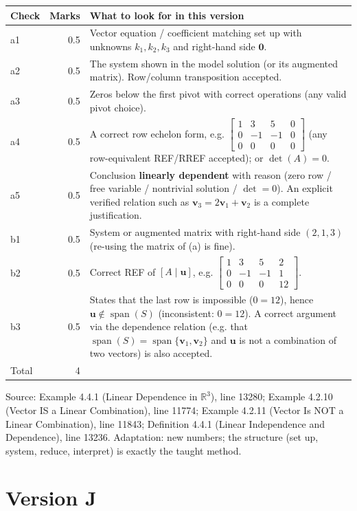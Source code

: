 \documentclass[11pt,a4paper]{article}
\newcommand{\Src}[1]{{\footnotesize\color{black!65}Source: #1}}
\begin{document}
\begin{tabularx}{\linewidth}{@{}l r X@{}}\toprule Check & Marks & What to look for in this version\\\midrule
a1 & 0.5 & Vector equation / coefficient matching set up with unknowns $k_1,k_2,k_3$ and right-hand side $\mathbf{0}$.\\
a2 & 0.5 & The system shown in the model solution (or its augmented matrix). Row/column transposition accepted.\\
a3 & 0.5 & Zeros below the first pivot with correct operations (any valid pivot choice).\\
a4 & 0.5 & A correct row echelon form, e.g. $\left[\begin{array}{ccc|c} 1 & 3 & 5 & 0 \\ 0 & -1 & -1 & 0 \\ 0 & 0 & 0 & 0 \end{array}\right]$ (any row-equivalent REF/RREF accepted); or $\det(A)=0$.\\
a5 & 0.5 & Conclusion \textbf{linearly dependent} with reason (zero row / free variable / nontrivial solution / $\det=0$). An explicit verified relation such as $\mathbf{v}_3=2\mathbf{v}_1+\mathbf{v}_2$ is a complete justification.\\
b1 & 0.5 & System or augmented matrix with right-hand side $(2,1,3)$ (re-using the matrix of (a) is fine).\\
b2 & 0.5 & Correct REF of $[A\mid\mathbf{u}]$, e.g. $\left[\begin{array}{ccc|c} 1 & 3 & 5 & 2 \\ 0 & -1 & -1 & 1 \\ 0 & 0 & 0 & 12 \end{array}\right]$.\\
b3 & 0.5 & States that the last row is impossible ($0=12$), hence $\mathbf{u}\notin\operatorname{span}(S)$ (inconsistent: $0=12$). A correct argument via the dependence relation (e.g. that $\operatorname{span}(S)=\operatorname{span}\{\mathbf{v}_1,\mathbf{v}_2\}$ and $\mathbf{u}$ is not a combination of two vectors) is also accepted.\\
\midrule Total & 4 & \\\bottomrule\end{tabularx}
\Src{Example 4.4.1 (Linear Dependence in $\mathbb{R}^3$), line 13280; Example 4.2.10 (Vector IS a Linear Combination), line 11774; Example 4.2.11 (Vector Is NOT a Linear Combination), line 11843; Definition 4.4.1 (Linear Independence and Dependence), line 13236. Adaptation: new numbers; the structure (set up, system, reduce, interpret) is exactly the taught method.}\par
\clearpage\section*{Version J}
\end{document}
